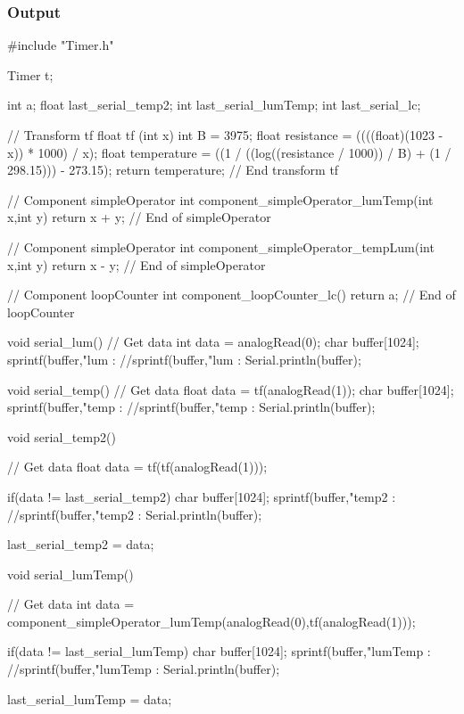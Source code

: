 \subsubsection*{Output}
\begin{arduinocode}
#include "Timer.h"

Timer t;

int a;
float last_serial_temp2;
int last_serial_lumTemp;
int last_serial_lc;

// Transform tf
float tf (int x) {
    int B = 3975;
    float resistance = ((((float)(1023 - x)) * 1000) / x);
    float temperature = ((1 / ((log((resistance / 1000)) / B) + (1 / 298.15))) - 273.15);
    return temperature;
}
// End transform tf

// Component simpleOperator
int component_simpleOperator_lumTemp(int x,int y) {
    return x + y;
}
// End of simpleOperator

// Component simpleOperator
int component_simpleOperator_tempLum(int x,int y) {
    return x - y;
}
// End of simpleOperator

// Component loopCounter
int component_loopCounter_lc() {
    return a;
}
// End of loopCounter

void serial_lum() {
    // Get data
    int data = analogRead(0);
    char buffer[1024];
    sprintf(buffer,"lum : %
    //sprintf(buffer,"lum : %
    Serial.println(buffer);
}

void serial_temp() {
    // Get data
    float data = tf(analogRead(1));
    char buffer[1024];
    sprintf(buffer,"temp : %
    //sprintf(buffer,"temp : %
    Serial.println(buffer);
}

void serial_temp2() {
    // Get data
    float data = tf(tf(analogRead(1)));

    if(data != last_serial_temp2) {
        char buffer[1024];
        sprintf(buffer,"temp2 : %
        //sprintf(buffer,"temp2 : %
        Serial.println(buffer);
    }

    last_serial_temp2 = data;
}

void serial_lumTemp() {
    // Get data
    int data = component_simpleOperator_lumTemp(analogRead(0),tf(analogRead(1)));

    if(data != last_serial_lumTemp) {
        char buffer[1024];
        sprintf(buffer,"lumTemp : %
        //sprintf(buffer,"lumTemp : %
        Serial.println(buffer);
    }

    last_serial_lumTemp = data;
}


\end{arduinocode}
